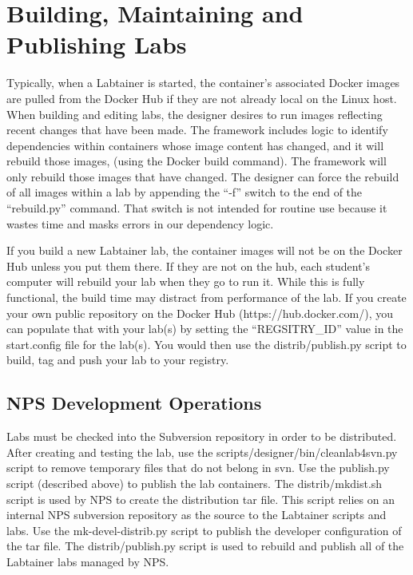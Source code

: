 \documentclass[12pt]{article}
\begin{document}
\section{Building, Maintaining and Publishing Labs} \label{publishing}
Typically, when a Labtainer is started, the container's associated Docker images are pulled from
the Docker Hub if they are not already local on the Linux host.  When building and editing labs,
the designer desires to run images reflecting recent changes that have been made.  The framework
includes logic to identify dependencies within containers whose image content has changed, 
and it will rebuild those images, (using the Docker build command).  The framework will only 
rebuild those images that have changed.  The designer can force the rebuild of all images within
a lab by appending the ``-f'' switch to the end of the ``rebuild.py'' command.  That switch is not
intended for routine use because it wastes time and masks errors in our dependency logic.

If you build a new Labtainer lab, the container images will not be on the Docker Hub unless you put
them there.  If they are not on the hub, each student's computer will rebuild your lab when they go to run it.
While this is fully functional, the build time may distract from performance of the lab.  If you
create your own public repository on the Docker Hub (https://hub.docker.com/), you can populate that
with your lab(s) by setting the ``REGSITRY\_ID'' value in the start.config file for the lab(s). You
would then use the distrib/publish.py script to build, tag and push your lab to your registry.

\subsection{NPS Development Operations}
Labs must be checked into the Subversion repository in order to be distributed.  After creating and testing
the lab, use the scripts/designer/bin/cleanlab4svn.py script to remove temporary files that do not belong in 
svn.  Use the publish.py script (described above) to publish the lab containers.
The distrib/mkdist.sh script is used by NPS to create the distribution tar file.  This script relies on
an internal NPS subversion repository as the source to the Labtainer scripts and labs.  Use the mk-devel-distrib.py script
to publish the developer configuration of the tar file.  The distrib/publish.py script is used to rebuild and 
publish all of the Labtainer labs managed by NPS.
\end{document}
